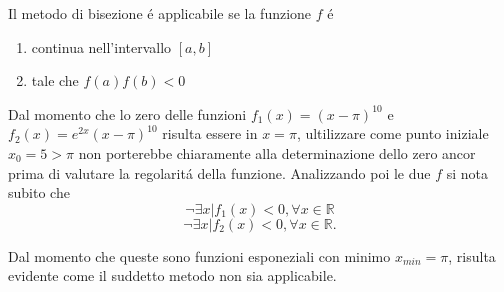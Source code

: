 Il metodo di bisezione \'e applicabile se la funzione \(f\) \'e
\begin{enumerate}

\item continua nell'intervallo \( [a,b] \)
\item tale che \( f(a)f(b)<0 \)

\end{enumerate}

Dal momento che lo zero delle funzioni \( f_1(x)=(x-\pi)^{10} \) e \( f_2(x)=e^{2x}(x-\pi)^{10} \) risulta essere in \( x=\pi \), ultilizzare come punto iniziale \( x_0 = 5 > \pi \) non porterebbe chiaramente alla determinazione dello zero ancor prima di valutare la regolarit\'a della funzione. 
Analizzando poi le due \( f \) si nota subito che \[
\neg \exists x | f_1(x)<0, \forall x \in \mathbb{R} \]  \[
\neg \exists x | f_2(x)<0, \forall x \in \mathbb{R}.
\]


\begin {flushleft} Dal momento che queste sono funzioni esponeziali con minimo \(x_{min} = \pi \), risulta evidente come il suddetto metodo non sia applicabile. \end{flushleft}
 

